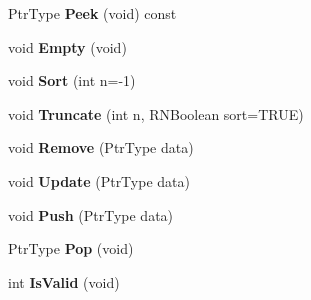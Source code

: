 \begin{DoxyCompactItemize}
\item 
Ptr\+Type {\bfseries Peek} (void) const \hypertarget{class_r_n_heap_a93c5fd94b674b094083af7ae5720f453}{}\label{class_r_n_heap_a93c5fd94b674b094083af7ae5720f453}

\item 
void {\bfseries Empty} (void)\hypertarget{class_r_n_heap_a92ccd84b8cfb29a5a9841a8074917c83}{}\label{class_r_n_heap_a92ccd84b8cfb29a5a9841a8074917c83}

\item 
void {\bfseries Sort} (int n=-\/1)\hypertarget{class_r_n_heap_ab30f1c07caea6b97a7a52647c185a4a5}{}\label{class_r_n_heap_ab30f1c07caea6b97a7a52647c185a4a5}

\item 
void {\bfseries Truncate} (int n, R\+N\+Boolean sort=T\+R\+UE)\hypertarget{class_r_n_heap_a2d71ba7e378aa45df266a922d1329636}{}\label{class_r_n_heap_a2d71ba7e378aa45df266a922d1329636}

\item 
void {\bfseries Remove} (Ptr\+Type data)\hypertarget{class_r_n_heap_a50c5a72ca55ac79b0ba9d85e4a645ef3}{}\label{class_r_n_heap_a50c5a72ca55ac79b0ba9d85e4a645ef3}

\item 
void {\bfseries Update} (Ptr\+Type data)\hypertarget{class_r_n_heap_a059daef56da28fedacf3cd8bbd4cba22}{}\label{class_r_n_heap_a059daef56da28fedacf3cd8bbd4cba22}

\item 
void {\bfseries Push} (Ptr\+Type data)\hypertarget{class_r_n_heap_a59d6520e607409d0c02190a583671608}{}\label{class_r_n_heap_a59d6520e607409d0c02190a583671608}

\item 
Ptr\+Type {\bfseries Pop} (void)\hypertarget{class_r_n_heap_a44b4a3cca8e16718d276e674ca76512a}{}\label{class_r_n_heap_a44b4a3cca8e16718d276e674ca76512a}

\item 
int {\bfseries Is\+Valid} (void)\hypertarget{class_r_n_heap_ac73bb2c00f869b931976ea6898d62aea}{}\label{class_r_n_heap_ac73bb2c00f869b931976ea6898d62aea}

\end{DoxyCompactItemize}
